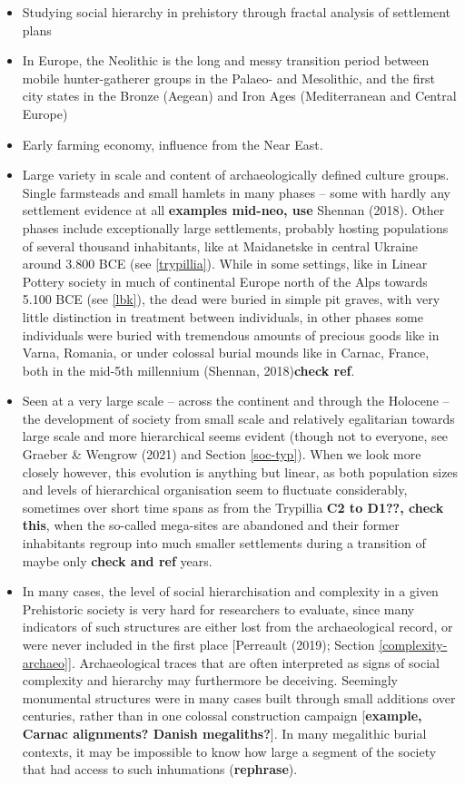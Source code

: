 \documentclass[
  12pt,
]{book}
\begin{document}
\begin{itemize}
\item
  Studying social hierarchy in prehistory through fractal analysis of settlement plans
\item
  In Europe, the Neolithic is the long and messy transition period between mobile hunter-gatherer groups in the Palaeo- and Mesolithic, and the first city states in the Bronze (Aegean) and Iron Ages (Mediterranean and Central Europe)
\item
  Early farming economy, influence from the Near East.
\item
  Large variety in scale and content of archaeologically defined culture groups. Single farmsteads and small hamlets in many phases -- some with hardly any settlement evidence at all \textbf{examples mid-neo, use} Shennan (2018). Other phases include exceptionally large settlements, probably hosting populations of several thousand inhabitants, like at Maidanetske in central Ukraine around 3.800 BCE (see \ref{trypillia}). While in some settings, like in Linear Pottery society in much of continental Europe north of the Alps towards 5.100 BCE (see \ref{lbk}), the dead were buried in simple pit graves, with very little distinction in treatment between individuals, in other phases some individuals were buried with tremendous amounts of precious goods like in Varna, Romania, or under colossal burial mounds like in Carnac, France, both in the mid-5th millennium (Shennan, 2018)\textbf{check ref}.
\item
  Seen at a very large scale -- across the continent and through the Holocene -- the development of society from small scale and relatively egalitarian towards large scale and more hierarchical seems evident (though not to everyone, see Graeber \& Wengrow (2021) and Section \ref{soc-typ}). When we look more closely however, this evolution is anything but linear, as both population sizes and levels of hierarchical organisation seem to fluctuate considerably, sometimes over short time spans as from the Trypillia \textbf{C2 to D1??, check this}, when the so-called mega-sites are abandoned and their former inhabitants regroup into much smaller settlements during a transition of maybe only \textbf{check and ref} years.
\item
  In many cases, the level of social hierarchisation and complexity in a given Prehistoric society is very hard for researchers to evaluate, since many indicators of such structures are either lost from the archaeological record, or were never included in the first place {[}Perreault (2019); Section \ref{complexity-archaeo}{]}. Archaeological traces that are often interpreted as signs of social complexity and hierarchy may furthermore be deceiving. Seemingly monumental structures were in many cases built through small additions over centuries, rather than in one colossal construction campaign {[}\textbf{example, Carnac alignments? Danish megaliths?}{]}. In many megalithic burial contexts, it may be impossible to know how large a segment of the society that had access to such inhumations (\textbf{rephrase}).

\end{itemize}
\end{document}
